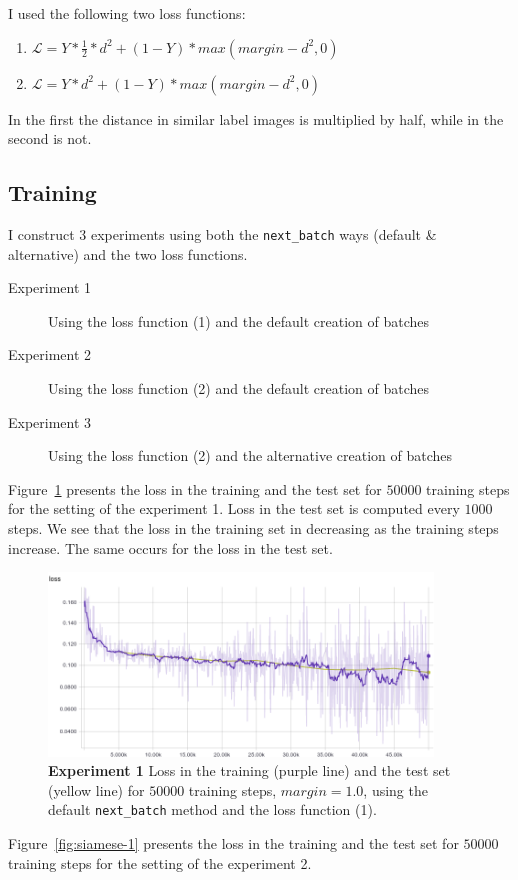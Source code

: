 \documentclass{article}
\begin{document}
I used the following two loss functions:
\begin{enumerate}
\item $\mathcal{L} =  Y * \frac{1}{2} * d^2 + (1-Y) * max(margin - d^2, 0)$
\item $\mathcal{L} =  Y * d^2 + (1-Y) * max(margin - d^2, 0)$
\end{enumerate}
In the first the distance in similar label images is multiplied by half, while in the second is not.


\subsection{Training}

I construct 3 experiments using both the \texttt{next\_batch} ways (default \& alternative) and the two loss functions.
\begin{description}
\item[Experiment 1]{Using the loss function (1) and the default creation of batches}
\item[Experiment 2]{Using the loss function (2) and the default creation of batches}
\item[Experiment 3]{Using the loss function (2) and the alternative creation of batches}
\end{description}
Figure~\ref{fig:siamese} presents the loss in the training and the test set for $50000$ training steps for the setting of the experiment 1.
Loss in the test set is computed every $1000$ steps.
We see that the loss in the training set in decreasing as the training steps increase.
The same occurs for the loss in the test set.
\begin{figure}[h!]
\centering
\includegraphics[width=10.2cm]{siamese.png}
\caption{\textbf{Experiment 1} Loss in the training (purple line) and the test set (yellow line) for $50000$ training steps, $margin = 1.0$, using the default \texttt{next\_batch} method and the loss function (1).}
\label{fig:siamese}
\end{figure}
Figure~\ref{fig:siamese-1} presents the loss in the training and the test set for $50000$ training steps for the setting of the experiment 2.
\end{document}
